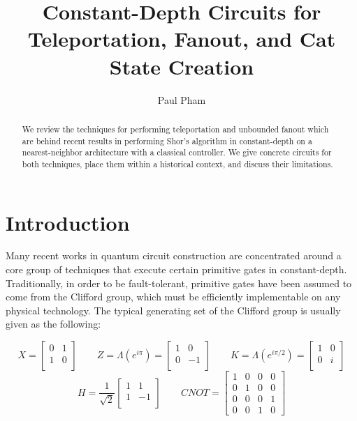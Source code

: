 \documentclass{article}
\title{Constant-Depth Circuits for Teleportation, Fanout, and Cat State Creation}
\author{Paul Pham}
\newcommand{\normtwo}{\frac{1}{\sqrt{2}}}
\begin{document}
\maketitle

\begin{abstract}
We review the techniques for performing teleportation
and unbounded fanout which are behind recent results in performing
Shor's algorithm in constant-depth on a nearest-neighbor architecture
with a classical controller. We give concrete circuits for both techniques,
place them within a historical context, and discuss their limitations.
\end{abstract}

\section{Introduction}
Many recent works in quantum circuit construction are concentrated around a
core group of techniques that execute certain primitive gates in constant-depth.
Traditionally, in order to be fault-tolerant,
primitive gates have been assumed to come from the Clifford
group, 
which must be efficiently implementable on any physical technology.
The typical generating set of the Clifford group is usually given as
the following:

\begin{equation}
X =
 \left[
  \begin{array}{cc}
    0 & 1 \\
    1 & 0 \\
  \end{array} \right]
\qquad
Z = \Lambda(e^{i\pi}) =
 \left[
  \begin{array}{cc}
    1 & 0 \\
    0 & -1 \\
  \end{array} \right]
\qquad
K = \Lambda(e^{i\pi/2}) =
 \left[
  \begin{array}{cc}
    1 & 0 \\
    0 & i \\
  \end{array} \right]
\end{equation}
\begin{equation}
H = \normtwo
 \left[
  \begin{array}{cc}
    1 & 1 \\
    1 & -1 \\
  \end{array} \right]
\qquad
CNOT =
 \left[
  \begin{array}{cccc}
    1 & 0 & 0 & 0 \\
    0 & 1 & 0 & 0 \\
    0 & 0 & 0 & 1 \\
    0 & 0 & 1 & 0
  \end{array} \right]
\end{equation}
\end{document}
